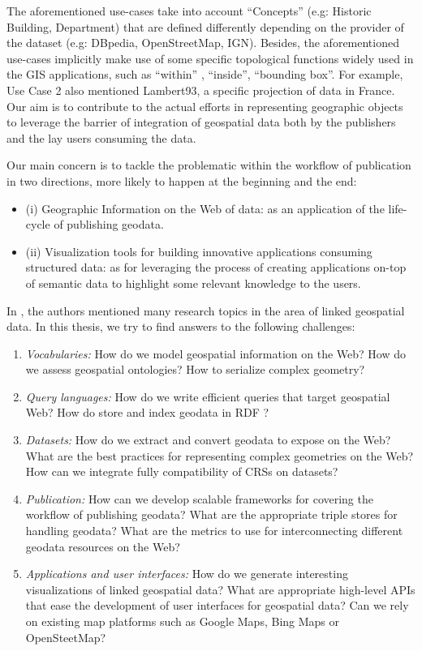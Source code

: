  The aforementioned use-cases take into account ``Concepts'' (e.g: Historic Building, Department) that are defined differently depending on the provider of the dataset (e.g: DBpedia, OpenStreetMap, IGN). Besides, the aforementioned use-cases implicitly make use of some specific topological functions widely used in the GIS applications, such as ``within'' , ``inside'', ``bounding box''. For example, Use Case 2 also mentioned Lambert93, a specific projection of data in France. Our aim is to contribute to the actual efforts in representing geographic objects to leverage the barrier of integration of geospatial data both by the publishers and the lay users consuming the data. 

Our main concern is to tackle the problematic within the workflow of publication in two directions, more likely to happen at the beginning and the end: 
\begin{itemize}
\item (i) Geographic Information on the Web of data: as an application of the life-cycle of publishing geodata.
\item (ii) Visualization tools for building innovative applications consuming structured data: as for leveraging the process of creating applications on-top of semantic data to highlight some relevant knowledge to the users.

\end{itemize}

In \cite{koubarakis12}, the authors mentioned many research topics in the area of linked geospatial data. In this thesis, we try to find answers to the following challenges:

\begin{enumerate}

\item \textit{Vocabularies:} How do we model geospatial information on the Web? How do we assess geospatial ontologies? How to serialize complex geometry? 
\item \textit{Query languages:} How do we write efficient queries that target geospatial Web? How do store and index geodata in RDF ?
\item \textit{Datasets:} How do we extract and convert geodata to expose on the Web? What are the best practices for representing complex geometries on the Web? How can we integrate fully compatibility of CRSs on datasets? 
\item \textit{Publication:} How can we develop scalable frameworks for covering the workflow of publishing geodata? What are the appropriate triple stores for handling geodata? What are the metrics to use for interconnecting different geodata resources on the Web?  
\item \textit{Applications and user interfaces:} How do we generate interesting visualizations of linked geospatial data? What are appropriate high-level APIs that ease the development of user interfaces for geospatial data? Can we rely on existing map platforms such as Google Maps, Bing Maps or OpenSteetMap?
\end{enumerate}

